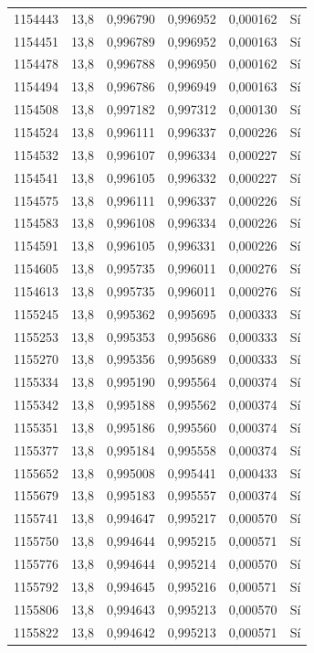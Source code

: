 \begin{longtable}{lccccc}
1154443 & 13,8 & 0,996790 & 0,996952 & 0,000162 & Sí \\
1154451 & 13,8 & 0,996789 & 0,996952 & 0,000163 & Sí \\
1154478 & 13,8 & 0,996788 & 0,996950 & 0,000162 & Sí \\
1154494 & 13,8 & 0,996786 & 0,996949 & 0,000163 & Sí \\
1154508 & 13,8 & 0,997182 & 0,997312 & 0,000130 & Sí \\
1154524 & 13,8 & 0,996111 & 0,996337 & 0,000226 & Sí \\
1154532 & 13,8 & 0,996107 & 0,996334 & 0,000227 & Sí \\
1154541 & 13,8 & 0,996105 & 0,996332 & 0,000227 & Sí \\
1154575 & 13,8 & 0,996111 & 0,996337 & 0,000226 & Sí \\
1154583 & 13,8 & 0,996108 & 0,996334 & 0,000226 & Sí \\
1154591 & 13,8 & 0,996105 & 0,996331 & 0,000226 & Sí \\
1154605 & 13,8 & 0,995735 & 0,996011 & 0,000276 & Sí \\
1154613 & 13,8 & 0,995735 & 0,996011 & 0,000276 & Sí \\
1155245 & 13,8 & 0,995362 & 0,995695 & 0,000333 & Sí \\
1155253 & 13,8 & 0,995353 & 0,995686 & 0,000333 & Sí \\
1155270 & 13,8 & 0,995356 & 0,995689 & 0,000333 & Sí \\
1155334 & 13,8 & 0,995190 & 0,995564 & 0,000374 & Sí \\
1155342 & 13,8 & 0,995188 & 0,995562 & 0,000374 & Sí \\
1155351 & 13,8 & 0,995186 & 0,995560 & 0,000374 & Sí \\
1155377 & 13,8 & 0,995184 & 0,995558 & 0,000374 & Sí \\
1155652 & 13,8 & 0,995008 & 0,995441 & 0,000433 & Sí \\
1155679 & 13,8 & 0,995183 & 0,995557 & 0,000374 & Sí \\
1155741 & 13,8 & 0,994647 & 0,995217 & 0,000570 & Sí \\
1155750 & 13,8 & 0,994644 & 0,995215 & 0,000571 & Sí \\
1155776 & 13,8 & 0,994644 & 0,995214 & 0,000570 & Sí \\
1155792 & 13,8 & 0,994645 & 0,995216 & 0,000571 & Sí \\
1155806 & 13,8 & 0,994643 & 0,995213 & 0,000570 & Sí \\
1155822 & 13,8 & 0,994642 & 0,995213 & 0,000571 & Sí \\

\end{longtable}
